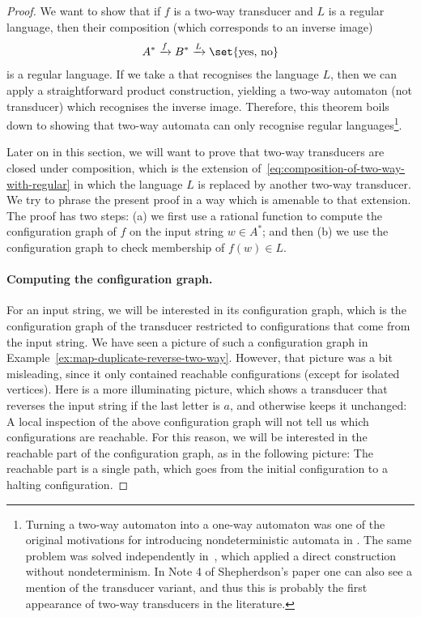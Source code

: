 \begin{proof}
    We want to show that if $f$ is a two-way transducer and $L$ is a regular language, then their composition (which corresponds to an inverse image)
    \begin{align}
        \label{eq:composition-of-two-way-with-regular}
        A^* \xrightarrow f B^* \xrightarrow L \set{\text{yes, no}}
    \end{align}
    is a regular language. If we take a \dfa that recognises the language $L$, then we can apply a straightforward product construction, yielding a two-way automaton (not transducer) which recognises the inverse image. Therefore, this theorem boils down to showing that two-way automata can only recognise regular languages\footnote{Turning a two-way automaton into a one-way automaton was one of the original motivations for introducing nondeterministic automata in \cite{RabinScott59}. The same problem was solved independently in~\cite{shepherdson1959reduction}, which applied a direct construction without nondeterminism. In Note 4 of Shepherdson's paper one can also see a mention of the transducer variant, and thus this is probably the first appearance of two-way transducers in the literature. }.
    
    Later on in this section, we will want to prove that two-way transducers are closed under composition, which is the extension of~\eqref{eq:composition-of-two-way-with-regular} in which the language $L$ is replaced by another two-way transducer. We try to phrase the present proof in a way which is amenable to that extension. The proof has two steps: (a) we first use a rational function to compute the configuration graph of $f$ on the input string $w \in A^*$; and then (b) we use the configuration graph to check membership of $f(w) \in L$.

    \paragraph*{Computing the configuration graph.} For an input string, we will be interested in its configuration graph, which is the configuration graph of the transducer restricted to configurations that come from the input string. We have seen a picture of such a configuration graph in Example~\ref{ex:map-duplicate-reverse-two-way}. However, that picture was a bit misleading, since it only contained reachable configurations (except for isolated vertices). 
    Here is a more illuminating picture, which shows a transducer that reverses the input string if the last letter is $a$, and otherwise keeps it unchanged:
    A local inspection of the above configuration graph will not tell us which configurations are reachable. For this reason, we will be interested in the reachable part of the configuration graph, as in the following picture:
    The reachable part is a single path, which goes from the initial configuration to a halting configuration. 
    

\end{proof}
